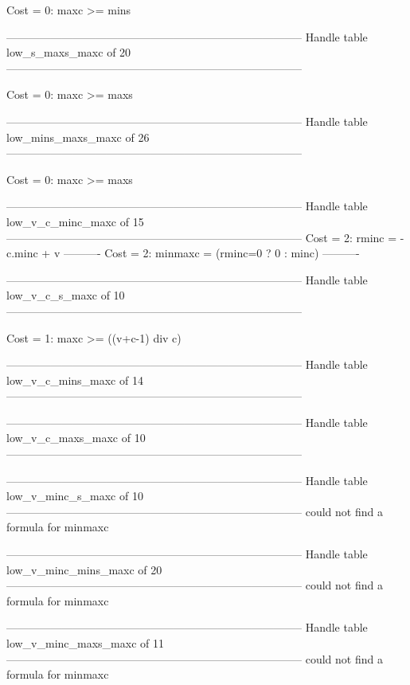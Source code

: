 Cost =  0:  maxc >= mins

--------------------------------------------------------------------------------
Handle table low_s_maxs_maxc of 20
--------------------------------------------------------------------------------

Cost =  0:  maxc >= maxs

--------------------------------------------------------------------------------
Handle table low_mins_maxs_maxc of 26
--------------------------------------------------------------------------------

Cost =  0:  maxc >= maxs

--------------------------------------------------------------------------------
Handle table low_v_c_minc_maxc of 15
--------------------------------------------------------------------------------
Cost =  2:  rminc   = -c.minc + v
----------
Cost =  2:  minmaxc = (rminc=0 ? 0 : minc)
----------


--------------------------------------------------------------------------------
Handle table low_v_c_s_maxc of 10
--------------------------------------------------------------------------------

Cost =  1:  maxc >= ((v+c-1) div c)

--------------------------------------------------------------------------------
Handle table low_v_c_mins_maxc of 14
--------------------------------------------------------------------------------


--------------------------------------------------------------------------------
Handle table low_v_c_maxs_maxc of 10
--------------------------------------------------------------------------------


--------------------------------------------------------------------------------
Handle table low_v_minc_s_maxc of 10
--------------------------------------------------------------------------------
could not find a formula for minmaxc


--------------------------------------------------------------------------------
Handle table low_v_minc_mins_maxc of 20
--------------------------------------------------------------------------------
could not find a formula for minmaxc


--------------------------------------------------------------------------------
Handle table low_v_minc_maxs_maxc of 11
--------------------------------------------------------------------------------
could not find a formula for minmaxc


